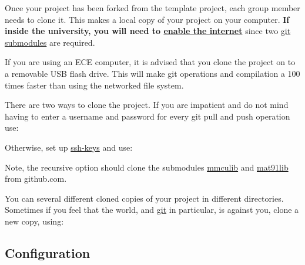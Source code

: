 Once your project has been forked from the template project, each group
member needs to clone it. This makes a local copy of your project on
your computer. \textbf{If inside the university, you will need to
\href{UC_internet_enabler}{enable the internet}} since two
\href{git_submodules}{git submodules} are required.

If you are using an ECE computer, it is advised that you clone the
project on to a removable USB flash drive. This will make git operations
and compilation a 100 times faster than using the networked file system.

There are two ways to clone the project. If you are impatient and do not
mind having to enter a username and password for every git pull and push
operation use:

\begin{Shaded}
\begin{Highlighting}[]
\NormalTok{$ }
\end{Highlighting}
\end{Shaded}

Otherwise, set up \url{ssh-keys} and use:

\begin{Shaded}
\begin{Highlighting}[]
\NormalTok{$ }
\end{Highlighting}
\end{Shaded}

Note, the recursive option should clone the submodules \url{mmculib} and
\url{mat91lib} from github.com.

You can several different cloned copies of your project in different
directories. Sometimes if you feel that the world, and \url{git} in
particular, is against you, clone a new copy, using:

\begin{Shaded}
\begin{Highlighting}[]
\NormalTok{$ }
\end{Highlighting}
\end{Shaded}

\subsection{Configuration}
\label{configuration}

